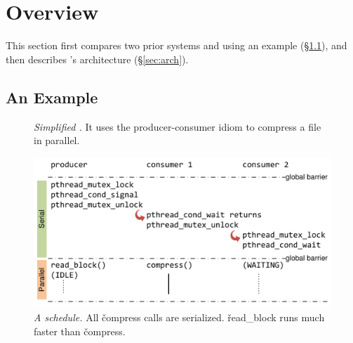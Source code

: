 \section{Overview} \label{sec:overview}

This section first compares two prior systems and \parrot using
an example (\S\ref{sec:example}), and then describes \parrot's architecture
(\S\ref{sec:arch}).

\subsection{An Example} \label{sec:example}

\begin{figure}[t]
\centering
\begin{minipage}{.5\textwidth}
\end{minipage}
\vspace{-.1in}
\caption{{\em Simplified \pbzip.} It uses the producer-consumer idiom to
  compress a file in parallel.} \label{fig:example}
\vspace{-.05in}
\end{figure}

\begin{figure}[t]
\centering
\includegraphics[width=\columnwidth]{parrot/figures/dthreads_schedule}
\vspace{-.2in}
\caption{{\em A \dthreads schedule.}  All
  \v{compress} calls are serialized. \v{read\_block} runs much faster than
  \v{compress}.}\label{fig:dthreads-schedule}
\vspace{-.05in}
\end{figure}

